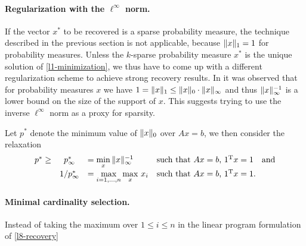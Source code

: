 \documentclass{article} %
\begin{document}
\paragraph{Regularization with the $\ell^\infty$ norm.} If the vector $x^*$ to be recovered is a sparse probability measure, the technique described in the previous section is not applicable, because $\lVert x\rVert_1 = 1$ for probability measures.
Unless the $k$-sparse probability measure $x^*$ is the unique solution of \eqref{l1-minimization}, we thus have to come up with a different regularization scheme to achieve strong recovery results.
In \cite{mert} it was observed that for probability measures $x$ we have $1 = \lVert x\rVert_1 \leq \lVert x\rVert_0\cdot \lVert x\rVert_\infty$ and thus $\lVert x\rVert_{\infty}^{-1}$ is a lower bound on the size of the support of $x$.
This suggests trying to use the inverse $\ell^\infty$ norm as a proxy for sparsity.

Let $p^*$ denote the minimum value of $\lVert x\rVert_0$ over $Ax = b$, we then consider the relaxation
\begin{equation}\label{l8-recovery}
  \begin{array}{rcllllr}
  p^* \geq& p_\infty^* &= \min\limits_x\, \lVert x\rVert_\infty^{-1}&\text{such that $Ax = b$, $1^{\rm T} x = 1$}\quad \text{and}\\[5pt]
  &1/p_\infty^* &= \max\limits_{i=1,\dots,n} \max\limits_{x}\,x_i&\text{such that $Ax = b$, $1^{\rm T} x = 1$.}
  \end{array}
\end{equation}

\paragraph{Minimal cardinality selection.} Instead of taking the maximum over $1\leq i\leq n$ in the linear program formulation of \eqref{l8-recovery}




\end{document}
